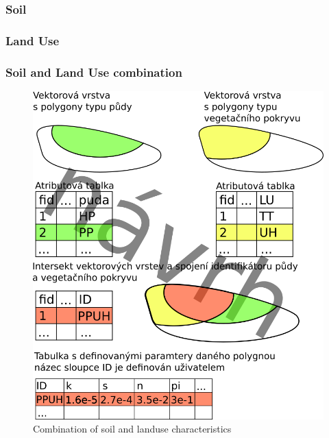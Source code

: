         \subsubsection{Soil}
        \subsubsection{Land Use}
        \subsubsection{Soil and Land Use  combination}
            \begin{figure}[!b]
                \centering
                \includegraphics[width=0.5\linewidth]{./img-prep/spojenistabulkou.png}
                \caption{Combination of soil and landuse characteristics}
                \label{fig:soilvegcreate}
            \end{figure}
        





